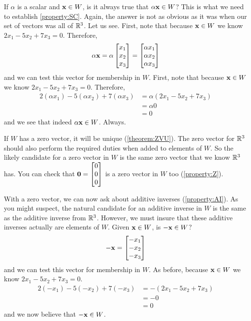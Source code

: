 \documentclass{ximera}
\begin{document}
\begin{example}
\begin{question}
    If $\alpha$ is a scalar and $\mathbf{x}\in W$, is it always true that
    $\alpha\mathbf{x}\in W$?  This is what we need to establish
    \ref{property:SC}.  Again, the answer is not as obvious as it was
    when our set of vectors was all of $\mathbb{R}^{3}$.  Let us see.  First,
    note that because $\mathbf{x}\in W$ we know $2x_1-5x_2+7x_3=0$.
    Therefore,
    \[
      \alpha\mathbf{x}=\alpha\begin{bmatrix}x_1\\x_2\\x_3\end{bmatrix}=\begin{bmatrix}\alpha x_1\\\alpha x_2\\\alpha x_3\end{bmatrix}
    \]
    and we can test this vector for membership in $W$.  First, note that
    because $\mathbf{x}\in W$ we know $2x_1-5x_2+7x_3=0$.  Therefore,
    \begin{align*}
      2(\alpha x_1)-5(\alpha x_2)+7(\alpha x_3)
      &=\alpha(2x_1-5x_2+7x_3)\\
      &=\alpha 0\\
      &=0
    \end{align*}
    and we see that indeed $\alpha\mathbf{x}\in W$.  Always.
    
    If $W$ has a zero vector, it will be unique (\ref{theorem:ZVU}).
    The zero vector for $\mathbb{R}^{3}$ should also perform the required
    duties when added to elements of $W$.  So the likely candidate for a
    zero vector in $W$ is the same zero vector that we know $\mathbb{R}^{3}$
    has.  You can check that $\mathbf{0}=\begin{bmatrix}0\\0\\0\end{bmatrix}$ is a zero
    vector in $W$ too (\ref{property:Z}).
    
    With a zero vector, we can now ask about additive inverses
    (\ref{property:AI}).  As you might suspect, the natural candidate
    for an additive inverse in $W$ is the same as the additive inverse
    from $\mathbb{R}^{3}$.  However, we must insure that these additive
    inverses actually are elements of $W$.  Given $\mathbf{x}\in W$, is
    $\mathbf{-x}\in W$?
    \[
      \mathbf{-x}=\begin{bmatrix}-x_1\\-x_2\\-x_3\end{bmatrix}
    \]
    and we can test this vector for membership in $W$.  As before, because $\mathbf{x}\in W$ we know $2x_1-5x_2+7x_3=0$.
    \begin{align*}
      2(-x_1)-5(-x_2)+7(-x_3)
      &=-(2x_1-5x_2+7x_3)\\
      &=-0\\
      &=0
    \end{align*}
    and we now believe that $\mathbf{-x}\in W$.
    

\end{question}
\end{example}
\end{document}
